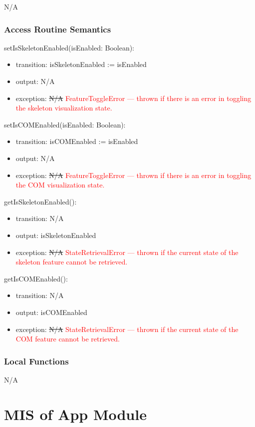 \documentclass[12pt, titlepage]{article}
\newcommand{\rt}[1]{\textcolor{red}{#1}}
\begin{document}
N/A

\subsubsection{Access Routine Semantics}

\noindent setIsSkeletonEnabled(isEnabled: Boolean):
\begin{itemize}
\item transition: isSkeletonEnabled := isEnabled
\item output: N/A
\item exception: \sout{N/A} \rt{FeatureToggleError --- thrown if there is an error in toggling the skeleton visualization state.}
\end{itemize}

\noindent setIsCOMEnabled(isEnabled: Boolean):
\begin{itemize}
\item transition: isCOMEnabled := isEnabled
\item output: N/A
\item exception: \sout{N/A} \rt{FeatureToggleError --- thrown if there is an error in toggling the COM visualization state.}
\end{itemize}

\noindent getIsSkeletonEnabled():
\begin{itemize}
\item transition: N/A
\item output: isSkeletonEnabled
\item exception: \sout{N/A} \rt{StateRetrievalError --- thrown if the current state of the skeleton feature cannot be retrieved.}
\end{itemize}

\noindent getIsCOMEnabled():
\begin{itemize}
\item transition: N/A
\item output: isCOMEnabled
\item exception: \sout{N/A} \rt{StateRetrievalError --- thrown if the current state of the COM feature cannot be retrieved.}
\end{itemize}


\subsubsection{Local Functions}

N/A


\section{MIS of App Module} \label{sec:appmodule}
\end{document}
